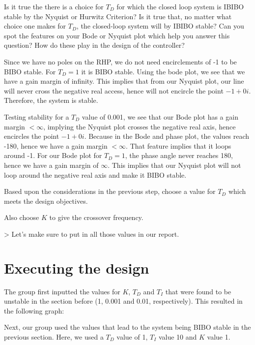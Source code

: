 
Is it true the there is a choice for $T_{D}$ for which the closed loop system is IBIBO stable by the Nyquist or Hurwitz Criterion? Is it true that, no matter what choice one makes for $T_D$, the closed-loop system will by IBIBO stable? Can you spot the features on your Bode or Nyquist plot which help you answer this question? How do these play in the design of the controller?

Since we have no poles on the RHP, we do not need encirclements of -1 to be BIBO stable. For $T_D = 1$ it is BIBO stable. Using the bode plot, we see that we have a gain margin of infinity. This implies that from our Nyquist plot, our line will never cross the negative real access, hence will not encircle the point $-1 + 0i$. Therefore, the system is stable. 

Testing stability for a $T_D$ value of 0.001, we see that our Bode plot has a gain margin $<\infty$, implying the Nyquist plot crosses the negative real axis, hence encircles the point $-1 + 0i$. Because in the Bode and phase plot, the values reach -180, hence we have a gain margin $<\infty$. That feature implies that it loops around -1. For our Bode plot for $T_D = 1$, the phase angle never reaches 180, hence we have a gain margin of $\infty$. This implies that our Nyquist plot will not loop around the negative real axis and make it BIBO stable.

Based upon the considerations in the previous step, choose a value for $T_D$ which meets the design objectives.

Also choose $K$ to give the crossover frequency. 

> Let's make sure to put in all those values in our report.

\section{Executing the design}

The group first inputted the values for $K$, $T_D$ and $T_I$ that were found to be unstable in the section before (1, 0.001 and 0.01, respectively). This resulted in the following graph:



Next, our group used the values that lead to the system being BIBO stable in the previous section. Here, we used a $T_D$ value of 1, $T_I$ value 10 and $K$ value 1. 

